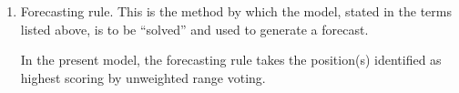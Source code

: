 \begin{enumerate}

%
%
\item Forecasting rule. This is the method by which the  model, stated in the terms listed above, is to be ``solved'' and used to generate a forecast. %

In the present model, the forecasting rule takes the   {position}(s) identified as highest scoring by unweighted range voting.






\end{enumerate}
